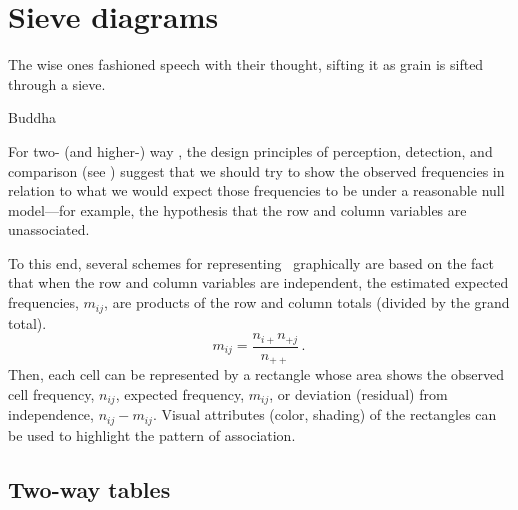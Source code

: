 \documentclass[10pt,krantz2]{krantz}\usepackage[]{graphicx}\usepackage[]{color}
\begin{document}
\section{Sieve diagrams}\label{sec:twoway-sieve}

\epigraph{The wise ones fashioned speech with their thought, sifting it as grain is sifted through a sieve.}{Buddha}
For two- (and higher-) way \ctabs, the
design principles of
perception, detection, and comparison
(see )
suggest that we should try to show the observed frequencies
in relation to what we would expect those frequencies to be
under a reasonable null model---for example, the
hypothesis that the row and column variables are unassociated.

To this end, several schemes for representing \ctabs\
graphically are
based on the fact that when the row and column variables are
independent, the estimated expected frequencies, \(m_{ij}\), are
products of the row and column totals (divided by the grand total).
\begin{equation*}
 m_{ij} = \frac{ n_{i+} n_{+j} } { n_{++} }
 \period
\end{equation*}
Then, each cell can be represented by a rectangle whose area shows
the observed cell frequency, \(n_{ij}\),  expected frequency, \(m_{ij}\),
or deviation (residual) from independence, \(n_{ij} - m_{ij}\).
Visual attributes (color, shading) of the rectangles can be used to
highlight the pattern of association.

\subsection{Two-way tables}\label{sec:twoway-sieve}
\end{document}

